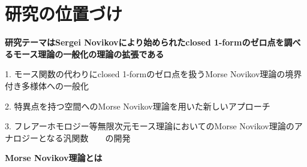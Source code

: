 \documentclass[11pt,a4j,dvipdfmx]{jarticle} 					%
\newcommand{\研究課題名}{象の卵}
\newcommand{\研究機関名}{京都大学}
\newcommand{\研究代表者氏名}{福士謙二}
\begin{document}

\section{研究の位置づけ}

\noindent\Large
\textbf{研究テーマはSergei Novikovにより始められたclosed 1-formのゼロ点を調べるモース理論の一般化の理論の拡張である}

\normalsize
\vspace{2mm}
1. モース関数の代わりにclosed 1-formのゼロ点を扱うMorse Novikov理論の境界付き多様体への一般化

2. 特異点を持つ空間へのMorse Novikov理論を用いた新しいアプローチ

3. フレアーホモロジー等無限次元モース理論においてのMorse Novikov理論のアナロジーとなる汎関数　　の開発


\vspace{2mm}
\noindent\Large
 \textbf{Morse Novikov理論とは}\normalsize
\vspace{1mm}
\end{document}

